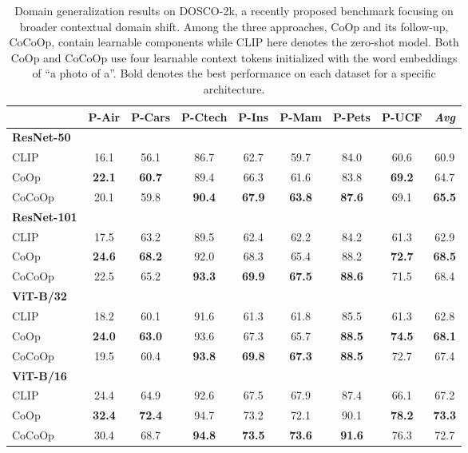 \documentclass[10pt,twocolumn,letterpaper]{article}
\newcommand{\tableCellHeight}{1}
\newcommand{\tabstyle}[1]{
  \setlength{\tabcolsep}{#1}
  \renewcommand{\arraystretch}{\tableCellHeight}
  \centering
  \small
}
\begin{document}
\begin{table*}[t]
    \tabstyle{9pt}
    \caption{Domain generalization results on DOSCO-2k, a recently proposed benchmark focusing on broader contextual domain shift. Among the three approaches, CoOp and its follow-up, CoCoOp, contain learnable components while CLIP here denotes the zero-shot model. Both CoOp and CoCoOp use four learnable context tokens initialized with the word embeddings of ``a photo of a''. Bold denotes the best performance on each dataset for a specific architecture.}
    \label{tab:dosco_2k}
    \begin{tabular}{l cccccccc}
    \toprule
    & P-Air & P-Cars & P-Ctech & P-Ins & P-Mam & P-Pets & P-UCF & \textit{Avg} \\
    \midrule
    \textbf{ResNet-50} & \\
    CLIP & 16.1 & 56.1 & 86.7 & 62.7 & 59.7 & 84.0 & 60.6 & 60.9 \\
    CoOp & \textbf{22.1} & \textbf{60.7} & 89.4 & 66.3 & 61.6 & 83.8 & \textbf{69.2} & 64.7 \\
    CoCoOp & 20.1 & 59.8 & \textbf{90.4} & \textbf{67.9} & \textbf{63.8} &  \textbf{87.6} & 69.1 & \textbf{65.5} \\
    \midrule
    \textbf{ResNet-101} & \\
    CLIP & 17.5 & 63.2 & 89.5 & 62.4 & 62.2 & 84.2 & 61.3 & 62.9 \\
    CoOp & \textbf{24.6} & \textbf{68.2} & 92.0 & 68.3 & 65.4 & 88.2 & \textbf{72.7} & \textbf{68.5} \\
    CoCoOp & 22.5 & 65.2 & \textbf{93.3} & \textbf{69.9} & \textbf{67.5} & \textbf{88.6} & 71.5 & 68.4 \\
    \midrule
    \textbf{ViT-B/32} & \\
    CLIP & 18.2 & 60.1 & 91.6 & 61.3 & 61.8 & 85.5 & 61.3 & 62.8 \\
    CoOp & \textbf{24.0} & \textbf{63.0} & 93.6 & 67.3 & 65.7 & \textbf{88.5} & \textbf{74.5} & \textbf{68.1} \\
    CoCoOp & 19.5 & 60.4 & \textbf{93.8} & \textbf{69.8} & \textbf{67.3} & \textbf{88.5} & 72.7 & 67.4 \\
    \midrule
    \textbf{ViT-B/16} & \\
    CLIP & 24.4 & 64.9 & 92.6 & 67.5 & 67.9 & 87.4 & 66.1 & 67.2 \\
    CoOp & \textbf{32.4} & \textbf{72.4} & 94.7 & 73.2 & 72.1 & 90.1 & \textbf{78.2} & \textbf{73.3} \\
    CoCoOp & 30.4 & 68.7 & \textbf{94.8} & \textbf{73.5} & \textbf{73.6} & \textbf{91.6} & 76.3 & 72.7 \\
    \bottomrule
    \end{tabular}
\end{table*}
\end{document}
